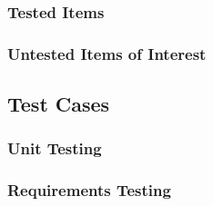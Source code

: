 \documentclass{article}
\begin{document}
\subsubsection{Tested Items}


\subsubsection{Untested Items of Interest}


\subsection{Test Cases}


\subsubsection{Unit Testing}



\subsubsection{Requirements Testing}
\end{document}
